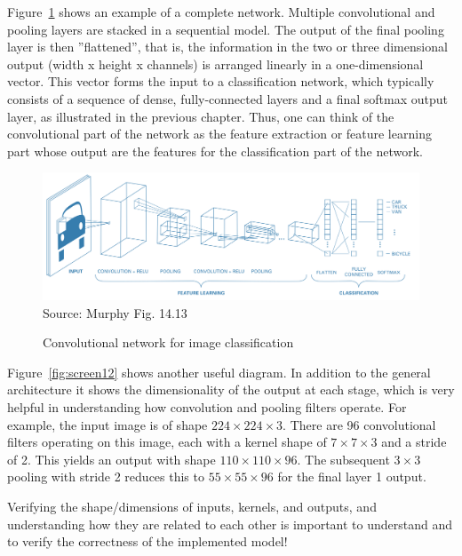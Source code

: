 Figure~\ref{fig:screen6} shows an example of a complete network. Multiple convolutional and pooling layers are stacked in a sequential model. The output of the final pooling layer is then ''flattened'', that is, the information in the two or three dimensional output (width x height x channels) is arranged linearly in a one-dimensional vector. This vector forms the input to a classification network, which typically consists of a sequence of dense, fully-connected layers and a final softmax output layer, as illustrated in the previous chapter. Thus, one can think of the convolutional part of the network as the feature extraction or feature learning part whose output are the features for the classification part of the network.

\begin{figure}
\centering
\includegraphics[width=\textwidth]{screen6.png} \\

\scriptsize Source: Murphy Fig. 14.13
\caption{Convolutional network for image classification}
\label{fig:screen6}
\end{figure}

Figure~\ref{fig:screen12} shows another useful diagram. In addition to the general architecture it shows the dimensionality of the output at each stage, which is very helpful in understanding how convolution and pooling filters operate. For example, the input image is of shape $224 \times 224 \times 3$. There are 96 convolutional filters operating on this image, each with a kernel shape of $7 \times 7 \times 3$ and a stride of 2. This yields an output with shape $110 \times 110 \times 96$. The subsequent $3 \times 3$ pooling with stride 2 reduces this to $55 \times 55 \times 96$ for the final layer 1 output. 

\begin{tcolorbox}[colback=alert]
Verifying the shape/dimensions of inputs, kernels, and outputs, and understanding how they are related to each other is important to understand and to verify the correctness of the implemented model!
\end{tcolorbox}

